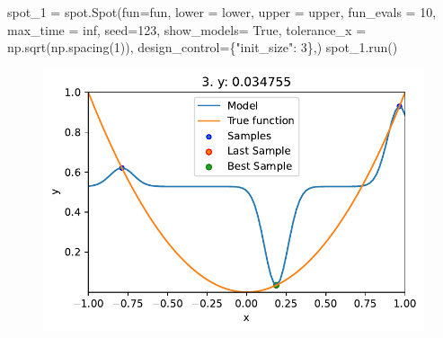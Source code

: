 \documentclass[
  letterpaper,
  DIV=11,
  numbers=noendperiod]{scrreprt}
\newenvironment{Shaded}{\begin{snugshade}}{\end{snugshade}}
\newcommand{\DecValTok}[1]{\textcolor[rgb]{0.68,0.00,0.00}{#1}}
\newcommand{\NormalTok}[1]{\textcolor[rgb]{0.00,0.23,0.31}{#1}}
\newcommand{\OperatorTok}[1]{\textcolor[rgb]{0.37,0.37,0.37}{#1}}
\newcommand{\StringTok}[1]{\textcolor[rgb]{0.13,0.47,0.30}{#1}}
\newcommand{\VariableTok}[1]{\textcolor[rgb]{0.07,0.07,0.07}{#1}}
\begin{document}
\begin{Shaded}
\begin{Highlighting}[]
\NormalTok{spot\_1 }\OperatorTok{=}\NormalTok{ spot.Spot(fun}\OperatorTok{=}\NormalTok{fun,}
\NormalTok{                   lower }\OperatorTok{=}\NormalTok{ lower,}
\NormalTok{                   upper }\OperatorTok{=}\NormalTok{ upper,}
\NormalTok{                   fun\_evals }\OperatorTok{=} \DecValTok{10}\NormalTok{,}
\NormalTok{                   max\_time }\OperatorTok{=}\NormalTok{ inf,}
\NormalTok{                   seed}\OperatorTok{=}\DecValTok{123}\NormalTok{,}
\NormalTok{                   show\_models}\OperatorTok{=} \VariableTok{True}\NormalTok{,}
\NormalTok{                   tolerance\_x }\OperatorTok{=}\NormalTok{ np.sqrt(np.spacing(}\DecValTok{1}\NormalTok{)),}
\NormalTok{                   design\_control}\OperatorTok{=}\NormalTok{\{}\StringTok{"init\_size"}\NormalTok{: }\DecValTok{3}\NormalTok{\},)}
\NormalTok{spot\_1.run()}
\end{Highlighting}
\end{Shaded}

\begin{figure}[H]

{\centering \includegraphics{010_num_spot_sklearn_surrogate_files/figure-pdf/cell-21-output-1.pdf}

}

\end{figure}
\end{document}
